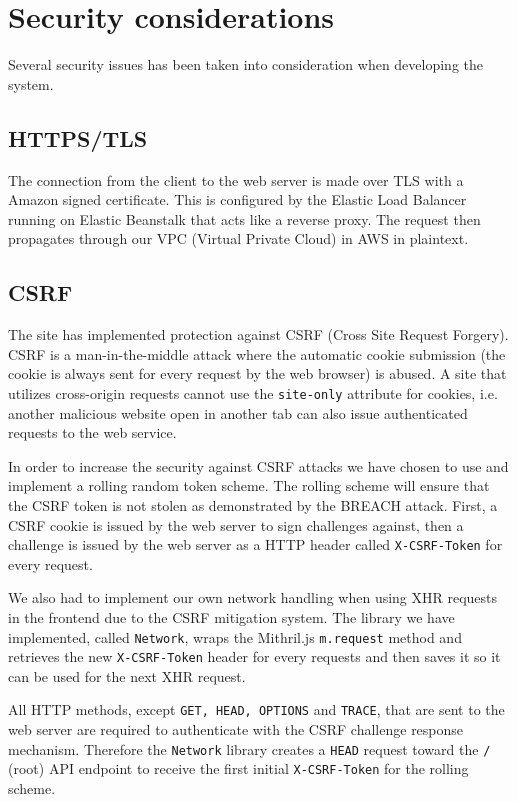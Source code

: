 \documentclass[12pt,a4paper]{report}
\begin{document}
\chapter{Security considerations}
Several security issues has been taken into consideration when developing the system.

\section{HTTPS/TLS}
The connection from the client to the web server is made over TLS with a Amazon signed certificate.
This is configured by the Elastic Load Balancer running on Elastic Beanstalk that acts like a reverse proxy.
The request then propagates through our VPC (Virtual Private Cloud) in AWS in plaintext. 

\section{CSRF}
\label{subsec:csrf}
The site has implemented protection against CSRF (Cross Site Request Forgery). CSRF is a man-in-the-middle attack where the automatic cookie submission (the cookie is always sent for every request by the web browser) is abused. A site that utilizes cross-origin requests cannot use the \texttt{site-only} attribute for cookies, i.e. another malicious website open in another tab can also issue authenticated requests to the web service\cite{rick}.

In order to increase the security against CSRF attacks we have chosen to use and implement a rolling random token scheme. The rolling scheme will ensure that the CSRF token is not stolen as demonstrated by the BREACH attack\cite{breach}. First, a CSRF cookie is issued by the web server to sign challenges against, then a challenge is issued by the web server as a HTTP header called \texttt{X-CSRF-Token} for every request.

We also had to implement our own network handling when using XHR requests in the frontend due to the CSRF mitigation system. The library we have implemented, called \texttt{Network}\cite{roaster-network}, wraps the Mithril.js \texttt{m.request} method and retrieves the new \texttt{X-CSRF-Token} header for every requests and then saves it so it can be used for the next XHR request.

All HTTP methods, except \texttt{GET, HEAD, OPTIONS} and \texttt{TRACE}, that are sent to the web server are required to authenticate with the CSRF challenge response mechanism. Therefore the \texttt{Network} library creates a \texttt{HEAD} request toward the \texttt{/} (root) API endpoint to receive the first initial \texttt{X-CSRF-Token} for the rolling scheme.
\end{document}
